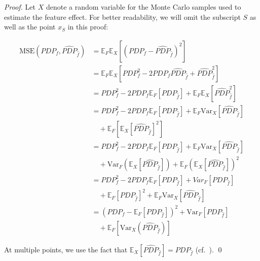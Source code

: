 \documentclass[runningheads]{llncs}
\begin{document}
\begin{proof}
    Let $X$ denote a random variable for the Monte Carlo samples used to estimate the feature effect.
    For better readability, we will omit the subscript $S$ as well as the point $x_S$ in this proof:

    \begin{align*}
        \text{MSE}(PDP_{f}, \widehat{PDP}_{\hat f})
         & = \mathbb{E}_F\mathbb{E}_X[{(PDP_f - \widehat{PDP}_{\hat f})}^2]                                                             \\
         & = \mathbb{E}_F \mathbb{E}_X[PDP_f^2 - 2PDP_f\widehat{PDP}_{\hat f} + \widehat{PDP}_{\hat f}^2]                               \\
         & = PDP_f^2 - 2PDP_f\mathbb{E}_F[PDP_{\hat f}] + \mathbb{E}_F\mathbb{E}_X[\widehat{PDP}_{\hat f}^2]                            \\
         & = PDP_f^2 - 2PDP_f\mathbb{E}_F[PDP_{\hat f}] + \mathbb{E}_F\text{Var}_X[\widehat{PDP}_{\hat f}]                              \\
         & \quad + \mathbb{E}_F[\mathbb{E}_X{[\widehat{PDP}_{\hat f}]}^2]                                                               \\
         & = PDP_f^2 - 2PDP_f\mathbb{E}_F[PDP_{\hat f}] + \mathbb{E}_F\text{Var}_X[\widehat{PDP}_{\hat f}]                              \\
         & \quad + \text{Var}_F(\mathbb{E}_X[\widehat{PDP}_{\hat f}]) + \mathbb{E}_F{(\mathbb{E}_X[\widehat{PDP}_{\hat f}])}^2          \\
         & = PDP_f^2 - 2PDP_f\mathbb{E}_F[PDP_{\hat f}] +  Var_F[PDP_{\hat f}]                                                          \\
         & \quad + \mathbb{E}_F{[PDP_{\hat f}]}^2 + \mathbb{E}_F\text{Var}_X[\widehat{PDP}_{\hat f}]                                    \\
         & = {(PDP_f - \mathbb{E}_F[PDP_{\hat f}])}^2 + \text{Var}_F[PDP_{\hat f}] \\
         &\quad + \mathbb{E}_F[\text{Var}_X(\widehat{PDP}_{\hat f})]
    \end{align*}

    \noindent At multiple points, we use the fact that $\mathbb{E}_X[\widehat{PDP}_{\hat f}]
        = PDP_{\hat f}$ (cf.~\cite{molnar_relating_2023}).
    \qed\
\end{proof}
\end{document}
